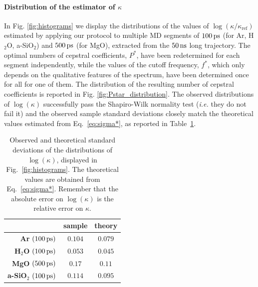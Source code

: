 \paragraph{Distribution of the estimator of $\kappa$}
In Fig. \ref{fig:histograms} we display the distributions of the values of $\log(\kappa/\kappa_{\mathrm{ref}})$ estimated by applying our protocol to multiple MD segments of $100\,\mathrm{ps}$ (for Ar, H$_2$O, a-SiO$_2$) and $500\,\mathrm{ps}$ (for MgO), extracted from the $50\,\mathrm{ns}$ long trajectory. The optimal numbers of cepstral coefficients, $P^*$, have been redetermined for each segment independently, while the values of the cutoff frequency, $f^*$, which only depends on the qualitative features of the spectrum, have been determined once for all for one of them. The distribution of the resulting number of cepstral coefficients is reported in Fig. \ref{fig:Pstar_distribution}. The observed distributions of $\log(\kappa)$ successfully pass the Shapiro-Wilk normality test \cite{Shapiro1965} (\emph{i.e.} they do not fail it) and the observed sample standard deviations closely match the theoretical values estimated from Eq.~\eqref{eq:sigma*}, as reported in Table~\ref{tab:logkappa-errors}. 
\begin{table}[!htb]
    \centering
    \begin{tabular}{rcc}
                  & \textbf{sample} & \textbf{theory} \\
        \hline
        \textbf{Ar} $(100\,\mathrm{ps})$       & $0.104$ & $0.079$ \\
        \textbf{H$_2$O} $(100\,\mathrm{ps})$   & $0.053$ & $0.045$ \\
        \textbf{MgO} $(500\,\mathrm{ps})$      & $0.17$  & $0.11$ \\
        \textbf{a-SiO$_2$} $(100\,\mathrm{ps})$ & $0.114$ & $0.095$ \\
    \end{tabular}
    \caption{Observed and theoretical standard deviations of the distributions of $\log(\kappa)$, displayed in Fig.~\ref{fig:histograms}. The theoretical values are obtained from Eq.~\eqref{eq:sigma*}. Remember that the absolute error on $\log(\kappa)$ is the relative error on $\kappa$.}
    \label{tab:logkappa-errors}
\end{table}
